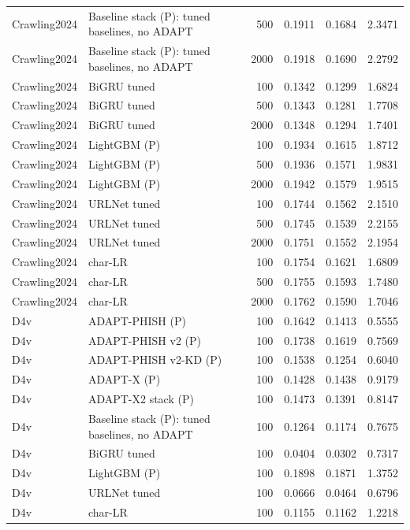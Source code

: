 \begin{table}[t]
\begin{tabular}{llrrrr}
Crawling2024 & Baseline stack (P): tuned baselines, no ADAPT & 500 & 0.1911 & 0.1684 & 2.3471 \\
Crawling2024 & Baseline stack (P): tuned baselines, no ADAPT & 2000 & 0.1918 & 0.1690 & 2.2792 \\
Crawling2024 & BiGRU tuned & 100 & 0.1342 & 0.1299 & 1.6824 \\
Crawling2024 & BiGRU tuned & 500 & 0.1343 & 0.1281 & 1.7708 \\
Crawling2024 & BiGRU tuned & 2000 & 0.1348 & 0.1294 & 1.7401 \\
Crawling2024 & LightGBM (P) & 100 & 0.1934 & 0.1615 & 1.8712 \\
Crawling2024 & LightGBM (P) & 500 & 0.1936 & 0.1571 & 1.9831 \\
Crawling2024 & LightGBM (P) & 2000 & 0.1942 & 0.1579 & 1.9515 \\
Crawling2024 & URLNet tuned & 100 & 0.1744 & 0.1562 & 2.1510 \\
Crawling2024 & URLNet tuned & 500 & 0.1745 & 0.1539 & 2.2155 \\
Crawling2024 & URLNet tuned & 2000 & 0.1751 & 0.1552 & 2.1954 \\
Crawling2024 & char-LR & 100 & 0.1754 & 0.1621 & 1.6809 \\
Crawling2024 & char-LR & 500 & 0.1755 & 0.1593 & 1.7480 \\
Crawling2024 & char-LR & 2000 & 0.1762 & 0.1590 & 1.7046 \\
D4v & ADAPT-PHISH (P) & 100 & 0.1642 & 0.1413 & 0.5555 \\
D4v & ADAPT-PHISH v2 (P) & 100 & 0.1738 & 0.1619 & 0.7569 \\
D4v & ADAPT-PHISH v2-KD (P) & 100 & 0.1538 & 0.1254 & 0.6040 \\
D4v & ADAPT-X (P) & 100 & 0.1428 & 0.1438 & 0.9179 \\
D4v & ADAPT-X2 stack (P) & 100 & 0.1473 & 0.1391 & 0.8147 \\
D4v & Baseline stack (P): tuned baselines, no ADAPT & 100 & 0.1264 & 0.1174 & 0.7675 \\
D4v & BiGRU tuned & 100 & 0.0404 & 0.0302 & 0.7317 \\
D4v & LightGBM (P) & 100 & 0.1898 & 0.1871 & 1.3752 \\
D4v & URLNet tuned & 100 & 0.0666 & 0.0464 & 0.6796 \\
D4v & char-LR & 100 & 0.1155 & 0.1162 & 1.2218 \\
\bottomrule
\end{tabular}
\end{table}
